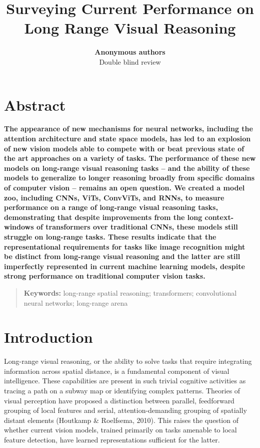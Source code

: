 \documentclass[10pt,letterpaper]{article}
\title{Surveying Current Performance on Long Range Visual Reasoning}
\author{{\large \bf Anonymous authors} \\
Double blind review}
\begin{document}
\maketitle


\section{Abstract}
{
\bf
The appearance of new mechanisms for neural networks, including the attention architecture and state space models, has led to an explosion of new vision models able to compete with or beat previous state of the art approaches on a variety of tasks. The performance of these new models on long-range visual reasoning tasks – and the ability of these models to generalize to longer reasoning broadly from specific domains of computer vision – remains an open question. We created a model zoo, including CNNs, ViTs, ConvViTs, and RNNs, to measure performance on a range of long-range visual reasoning tasks, demonstrating that despite improvements from the long context-windows of transformers over traditional CNNs, these models still struggle on long-range tasks. These results indicate that the representational requirements for tasks like image recognition might be distinct from long-range visual reasoning and the latter are still imperfectly represented in current machine learning models, despite strong performance on traditional computer vision tasks.
}
\begin{quote}
\small
\textbf{Keywords:} 
long-range spatial reasoning; transformers; convolutional neural networks; long-range arena
\end{quote}

\section{Introduction}
Long-range visual reasoning, or the ability to solve tasks that require integrating information across spatial distance, is a fundamental component of visual intelligence. These capabilities are present in such trivial cognitive activities as tracing a path on a subway map or identifying complex patterns. Theories of visual perception have proposed a distinction between parallel, feedforward grouping of local features and serial, attention-demanding grouping of spatially distant elements (Houtkamp \& Roelfsema, 2010). This raises the question of whether current vision models, trained primarily on tasks amenable to local feature detection, have learned representations sufficient for the latter.
\end{document}
